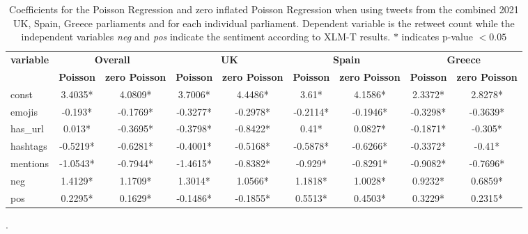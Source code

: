 \begin{table}[hbp!]
\begin{adjustbox}{width=\textwidth,center}
\begin{tabular}{|l|cc|cc|cc|cc|}
\hline
\multirow{2}{*}{\textbf{variable}} &
  \multicolumn{2}{c|}{\textbf{Overall}} &
  \multicolumn{2}{c|}{\textbf{UK}} &
  \multicolumn{2}{c|}{\textbf{Spain}} &
  \multicolumn{2}{c|}{\textbf{Greece}} \\ \cline{2-9} 
 &
  \multicolumn{1}{c|}{\textbf{Poisson}} &
  \textbf{zero Poisson} &
  \multicolumn{1}{c|}{\textbf{Poisson}} &
  \textbf{zero Poisson} &
  \multicolumn{1}{c|}{\textbf{Poisson}} &
  \textbf{zero Poisson} &
  \multicolumn{1}{c|}{\textbf{Poisson}} &
  \textbf{zero Poisson} \\ \hline
const &
  \multicolumn{1}{c|}{3.4035*} &
  4.0809* &
  \multicolumn{1}{c|}{3.7006*} &
  4.4486* &
  \multicolumn{1}{c|}{3.61*} &
  4.1586* &
  \multicolumn{1}{c|}{2.3372*} &
  2.8278* \\ \hline
emojis &
  \multicolumn{1}{c|}{-0.193*} &
  -0.1769* &
  \multicolumn{1}{c|}{-0.3277*} &
  -0.2978* &
  \multicolumn{1}{c|}{-0.2114*} &
  -0.1946* &
  \multicolumn{1}{c|}{-0.3298*} &
  -0.3639* \\ \hline
has\_url &
  \multicolumn{1}{c|}{0.013*} &
  -0.3695* &
  \multicolumn{1}{c|}{-0.3798*} &
  -0.8422* &
  \multicolumn{1}{c|}{0.41*} &
  0.0827* &
  \multicolumn{1}{c|}{-0.1871*} &
  -0.305* \\ \hline
hashtags &
  \multicolumn{1}{c|}{-0.5219*} &
  -0.6281* &
  \multicolumn{1}{c|}{-0.4001*} &
  -0.5168* &
  \multicolumn{1}{c|}{-0.5878*} &
  -0.6266* &
  \multicolumn{1}{c|}{-0.3372*} &
  -0.41* \\ \hline
mentions &
  \multicolumn{1}{c|}{-1.0543*} &
  -0.7944* &
  \multicolumn{1}{c|}{-1.4615*} &
  -0.8382* &
  \multicolumn{1}{c|}{-0.929*} &
  -0.8291* &
  \multicolumn{1}{c|}{-0.9082*} &
  -0.7696* \\ \hline
neg &
  \multicolumn{1}{c|}{1.4129*} &
  1.1709* &
  \multicolumn{1}{c|}{1.3014*} &
  1.0566* &
  \multicolumn{1}{c|}{1.1818*} &
  1.0028* &
  \multicolumn{1}{c|}{0.9232*} &
  0.6859* \\ \hline
pos &
  \multicolumn{1}{c|}{0.2295*} &
  0.1629* &
  \multicolumn{1}{c|}{-0.1486*} &
  -0.1855* &
  \multicolumn{1}{c|}{0.5513*} &
  0.4503* &
  \multicolumn{1}{c|}{0.3229*} &
  0.2315* \\ \hline
\end{tabular}
\end{adjustbox}
\caption{Coefficients for the Poisson Regression and zero inflated Poisson Regression when using tweets from the combined 2021 UK, Spain, Greece parliaments and for each individual parliament. Dependent variable is the retweet count while the independent variables \textit{neg} and \textit{pos} indicate the sentiment according to XLM-T results. $*$ indicates p-value $< 0.05$ }.
\label{tab:Politics-poisson_results}
\end{table}




